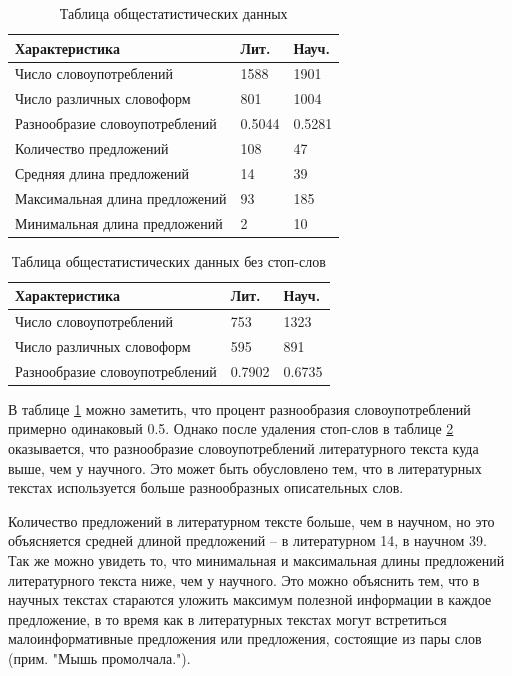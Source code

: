 \documentclass[12pt]{article}
\begin{document}
\begin{table}[h!]
\centering
\begin{tabular}{ |p{7cm}||p{3cm}|p{3cm}| }
 \hline
 Характеристика& Лит. &Науч.\\
 \hline
 Число словоупотреблений & 1588 & 1901\\
 Число различных словоформ & 801 & 1004 \\
 Разнообразие словоупотреблений & 0.5044 & 0.5281 \\
 \hline
 Количество предложений & 108 & 47 \\
 Средняя длина предложений & 14 & 39 \\
 Максимальная длина предложений & 93 & 185   \\
 Минимальная длина предложений & 2 & 10 \\
 \hline
\end{tabular}
\caption{Таблица общестатистических данных}
\label{table:1}
\end{table}

\begin{table}[h!]
\centering
\begin{tabular}{ |p{7cm}||p{3cm}|p{3cm}| }
 \hline
 Характеристика& Лит. &Науч.\\
 \hline
 Число словоупотреблений & 753 & 1323\\
 Число различных словоформ & 595 & 891 \\
 Разнообразие словоупотреблений & 0.7902 & 0.6735 \\
 \hline
\end{tabular}
\caption{Таблица общестатистических данных без стоп-слов}
\label{table:2}
\end{table}

В таблице \ref{table:1} можно заметить, что процент разнообразия словоупотреблений примерно одинаковый 0.5. Однако после удаления стоп-слов в таблице \ref{table:2} оказывается, что разнообразие словоупотреблений литературного текста куда выше, чем у научного. Это может быть обусловлено тем, что в литературных текстах используется больше разнообразных описательных слов.

Количество предложений в литературном тексте больше, чем в научном, но это объясняется средней длиной предложений -- в литературном 14, в научном 39. Так же можно увидеть то, что минимальная и максимальная длины предложений литературного текста ниже, чем у научного. Это можно объяснить тем, что в научных текстах стараются уложить максимум полезной информации в каждое предложение, в то время как в литературных текстах могут встретиться малоинформативные предложения или предложения, состоящие из пары слов (прим. "Мышь промолчала.").
\end{document}
